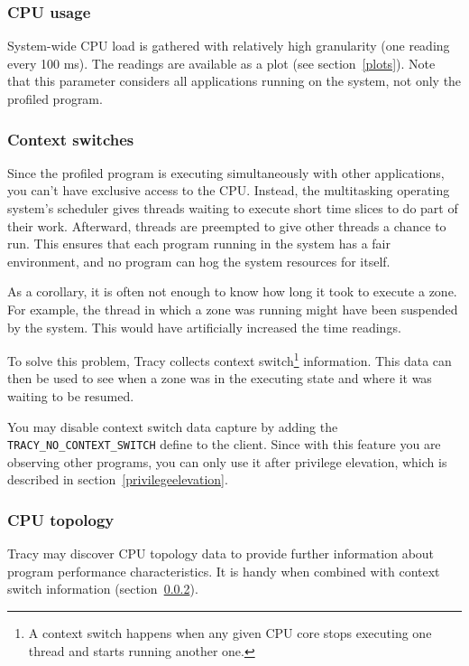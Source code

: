 \documentclass[hidelinks,titlepage,a4paper,twoside]{article}
\begin{document}
\subsubsection{CPU usage}

System-wide CPU load is gathered with relatively high granularity (one reading every 100 \si{\milli\second}). The readings are available as a plot (see section~\ref{plots}). Note that this parameter considers all applications running on the system, not only the profiled program.

\subsubsection{Context switches}
\label{contextswitches}

Since the profiled program is executing simultaneously with other applications, you can't have exclusive access to the CPU. Instead, the multitasking operating system's scheduler gives threads waiting to execute short time slices to do part of their work. Afterward, threads are preempted to give other threads a chance to run. This ensures that each program running in the system has a fair environment, and no program can hog the system resources for itself.

As a corollary, it is often not enough to know how long it took to execute a zone. For example, the thread in which a zone was running might have been suspended by the system. This would have artificially increased the time readings.

To solve this problem, Tracy collects context switch\footnote{A context switch happens when any given CPU core stops executing one thread and starts running another one.} information. This data can then be used to see when a zone was in the executing state and where it was waiting to be resumed.

You may disable context switch data capture by adding the \texttt{TRACY\_NO\_CONTEXT\_SWITCH} define to the client. Since with this feature you are observing other programs, you can only use it after privilege elevation, which is described in section~\ref{privilegeelevation}.

\subsubsection{CPU topology}
\label{cputopology}

Tracy may discover CPU topology data to provide further information about program performance characteristics. It is handy when combined with context switch information (section~\ref{contextswitches}).
\end{document}
